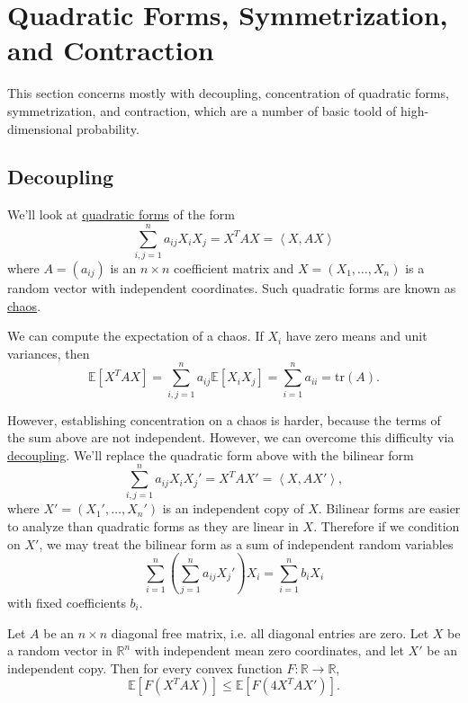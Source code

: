 \section{Quadratic Forms, Symmetrization, and Contraction}
This section concerns mostly with decoupling, concentration of quadratic forms, symmetrization, and contraction, 
which are a number of basic toold of high-dimensional probability.



\subsection{Decoupling}
We'll look at \underline{quadratic forms} of the form
\[ \sum_{i, j = 1}^{n} a_{ij} X_i X_j = X^T AX = \left\langle X, AX \right\rangle \]
where $A = (a_{ij})$ is an $n \times n$ coefficient matrix and $X = (X_1, \dots, X_n)$ is a random vector 
with independent coordinates. Such quadratic forms are known as \underline{chaos}.

We can compute the expectation of a chaos. If $X_i$ have zero means and unit variances, then 
\[ \mathbb{E}[X^T AX] = \sum_{i, j = 1}^{n} a_{ij} \mathbb{E}[X_i X_j] 
= \sum_{i = 1}^{n} a_{ii} = \mathrm{tr}(A). \]

However, establishing concentration on a chaos is harder, because the terms of the sum above are not 
independent. However, we can overcome this difficulty via \underline{decoupling}. We'll replace the quadratic 
form above with the bilinear form 
\[ \sum_{i, j = 1}^{n} a_{ij}  X_iX_j' = X^T AX' = \left\langle X, AX' \right\rangle,  \]
where $X' = (X_1', \dots, X_n')$ is an independent copy of $X$. Bilinear forms are easier to analyze than 
quadratic forms as they are linear in $X$. Therefore if we condition on $X'$, we may treat the bilinear form 
as a sum of independent random variables
\[ \sum_{i = 1}^{n} \left( \sum_{j = 1}^{n} a_{ij} X_j' \right) X_i = \sum_{i = 1}^{n} b_i X_i \]
with fixed coefficients $b_i$.

\begin{theorem}[Decoupling]
\label{thm:6.1.1}
Let $A$ be an $n \times n$ diagonal free matrix, i.e. all diagonal entries are zero. Let $X$ be a random vector 
in $\mathbb{R}^n$ with independent mean zero coordinates, and let $X'$ be an independent copy. Then for every 
convex function $F: \mathbb{R} \to \mathbb{R}$, 
\[ \mathbb{E}[F(X^T AX)] \leq \mathbb{E}[F(4X^T AX')]. \]
\end{theorem}

